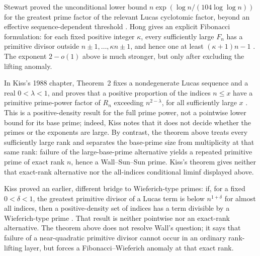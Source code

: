\begin{remark}
\label{rem:large-primitive-comparison}
Stewart proved the unconditional lower bound
$n\exp(\log n/(104\log\log n))$ for the greatest prime factor of the relevant
Lucas cyclotomic factor, beyond an effective sequence-dependent threshold
\cite[Theorem~1]{Stewart2013DivisorsLucasLehmer}.  Hong gives an explicit
Fibonacci formulation: for each fixed positive integer $\kappa$, every
sufficiently large $F_n$ has a primitive divisor outside
$n\pm1,\ldots,\kappa n\pm1$, and hence one at least
$(\kappa+1)n-1$ \cite[Theorem~1.1]{Hong2025BigPrimitiveDivisors}.
The exponent $2-o(1)$ above is much stronger, but only after excluding the
lifting anomaly.

In Kiss's 1988 chapter, Theorem~2 fixes a nondegenerate Lucas sequence and a
real $0<\lambda<1$, and proves that a positive proportion of the indices
$n\leq x$ have a primitive prime-power factor of $R_n$ exceeding
$n^{2-\lambda}$, for all sufficiently large $x$
\cite[Theorem~2]{Kiss1988PrimitiveDivisors}.  This is a positive-density
result for the full prime power, not a pointwise lower bound for its base
prime; indeed, Kiss notes that it does not decide whether the primes or the
exponents are large.  By contrast, the theorem above treats every
sufficiently large rank and separates the base-prime size from multiplicity
at that same rank: failure of the large-base-prime alternative yields a
repeated primitive prime of exact rank $n$, hence a Wall--Sun--Sun prime.
Kiss's theorem gives neither that exact-rank alternative nor the all-indices
conditional liminf displayed above.

Kiss proved an earlier, different bridge to Wieferich-type primes: if, for a
fixed $0<\delta<1$, the greatest primitive divisor of a Lucas term is below
$n^{1+\delta}$ for almost all indices, then a positive-density set of indices
has a term divisible by a Wieferich-type prime
\cite{Kiss1987WieferichLucas}.  That result is neither pointwise nor an
exact-rank alternative.  The theorem above does not resolve Wall's question;
it says that failure of a near-quadratic primitive divisor cannot occur in an
ordinary rank-lifting layer, but forces a Fibonacci--Wieferich anomaly at that
exact rank.
\end{remark}
